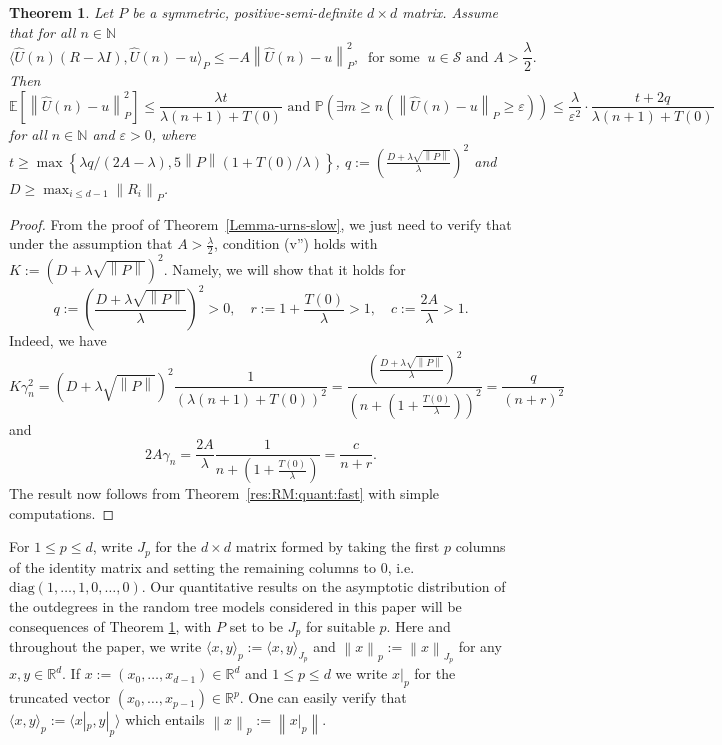 \documentclass[12pt]{amsart}
\newtheorem{theorem}{Theorem}[section]
\theoremstyle{definition}
\theoremstyle{remark}
\newcommand{\norm}[1]{\left\lVert#1\right\rVert}
\newcommand{\NN}{\mathbb{N}}
\newcommand{\RR}{\mathbb{R}}
\newcommand{\PP}{\mathbb{P}}
\newcommand{\EE}{\mathbb{E}}
\begin{document}
\begin{theorem}\label{Lemma-urns-fast}
 Let $P$ be a symmetric, positive-semi-definite $d \times d$ matrix. Assume that for all $n\in\NN$
  \begin{equation*}
    \langle \hat{U}(n)(R-\lambda I),\hat{U}(n) -u\rangle_P \le-A\norm{\hat{U}(n) -u}_P^2,\ \text{ for some }\ u \in \mathcal{S} \mbox{ and } A > \frac{\lambda}{2}.\tag{$**$}
\end{equation*}
 Then
  \[
\EE\left[\norm{\hat{U}(n)-u}_P^2\right]\leq\frac{\lambda t}{\lambda(n+1)+T(0)} \text{ and }\PP\left(\exists m\geq n\left(\norm{\hat{U}(n)-u}_P\geq \varepsilon\right)\right)\leq \frac{\lambda}{\varepsilon^2}\cdot\frac{t+2q}{\lambda(n+1)+T(0)}
\]
for all $n\in\mathbb{N}$ and $\varepsilon>0$, where $t\geq \max\left\{\lambda q/(2A-\lambda),5\norm{P}(1+T(0)/\lambda)\right\}$,
$q:=\left(\frac{D+\lambda\sqrt{\norm{P}}}{\lambda}\right)^2$ and $D\ge \max_{i\le d-1}\norm{R_i}_P$.
\end{theorem}

\begin{proof}
From the proof of Theorem~\ref{Lemma-urns-slow}, we just need to verify that under the assumption that $A>\frac{\lambda}{2}$, condition (v'') holds with $K:=(D+\lambda\sqrt{\norm{P}})^2$. Namely, we will show that it holds for 
   \[
    q:=\left(\frac{D+\lambda\sqrt{\norm{P}}}{\lambda}\right)^2> 0, \quad r:=1+\frac{T(0)}{\lambda}>1, \quad c:=\frac{2A}{\lambda}>1.
   \]
   Indeed, we have
   \begin{equation*}
       K\gamma_n^2=(D+\lambda\sqrt{\norm{P}})^2\frac{1}{(\lambda(n+1)+T(0))^2}=\frac{\left(\frac{D+\lambda\sqrt{\norm{P}}}{\lambda}\right)^2}{(n+(1+\frac{T(0)}{\lambda}))^2}=\frac{q}{(n+r)^2}
   \end{equation*}
   and
   \begin{equation*}
       2A\gamma_n=\frac{2A}{\lambda}\frac{1}{n+(1+\frac{T(0)}{\lambda})}=\frac{c}{n+r}.
   \end{equation*}
   The result now follows from Theorem~\ref{res:RM:quant:fast} with simple computations.
\end{proof}
For $1\le p \le d$, write $J_p$ for the $d \times d$ matrix formed by taking the first $p$ columns of the identity matrix and setting the remaining columns to 0, i.e.\ $\mathrm{diag}(1,\ldots,1,0,\ldots,0)$. Our quantitative results on the asymptotic distribution of the outdegrees in the random tree models considered in this paper will be consequences of Theorem \ref{Lemma-urns-fast}, with  $P$ set to be $J_p$ for suitable $p$. Here and throughout the paper, we write $\langle x,y \rangle_p:= \langle x,y \rangle_{J_p}$ and $\norm{x}_p:= \norm{x}_{J_p}$ for any  $x,y \in \RR^d$. If $x:=(x_0,\ldots,x_{d-1}) \in \RR^d$ and $1\le p \le d$ we write $x|_p$ for the truncated vector $(x_0,\ldots,x_{p-1}) \in \RR^p$. One can easily verify that $\langle x,y \rangle_p:=\langle x|_p,y|_p \rangle$ which entails $\norm{x}_p:= \norm{x|_p}$.\\
\end{document}
